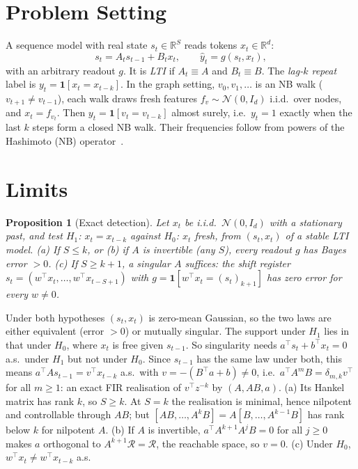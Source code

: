 \documentclass[journal]{IEEEtran}
\newtheorem{proposition}{Proposition}
\theoremstyle{remark}
\newcommand{\R}{\mathbb{R}}
\newcommand{\one}{\mathbf{1}}
\begin{document}
\section{Problem Setting}
A sequence model with real state $s_t\in\R^S$ reads tokens $x_t\in\R^d$:
\begin{equation}
  s_t = A_t s_{t-1} + B_t x_t,\qquad \hat y_t = g(s_t,x_t),
  \label{eq:ssm}
\end{equation}
with an arbitrary readout $g$. It is \emph{LTI} if $A_t\equiv A$ and
$B_t\equiv B$. The \emph{lag-$k$ repeat} label is $y_t=\one[x_t=x_{t-k}]$.
In the graph setting, $v_0,v_1,\dots$ is an NB walk ($v_{t+1}\ne v_{t-1}$),
each walk draws fresh features $f_v\sim\mathcal N(0,I_d)$ i.i.d.\ over nodes,
and $x_t=f_{v_t}$. Then $y_t=\one[v_t=v_{t-k}]$ almost surely, i.e.\ $y_t=1$
exactly when the last $k$ steps form a closed NB walk. Their frequencies
follow from powers of the Hashimoto (NB) operator~\cite{hashimoto1989zeta,alon2007nbw}.

\section{Limits}
\begin{proposition}[Exact detection]\label{prop:exact}
Let $x_t$ be i.i.d.\ $\mathcal N(0,I_d)$ with a stationary past, and test
$H_1$: $x_t=x_{t-k}$ against $H_0$: $x_t$ fresh, from $(s_t,x_t)$ of a
stable LTI model. (a) If $S\le k$, or (b) if $A$ is invertible (any $S$), every readout
$g$ has Bayes error $>0$. (c) If $S\ge k+1$, a singular $A$ suffices: the
shift register $s_t=(w^\top x_t,\dots,w^\top x_{t-S+1})$ with
$g=\one[w^\top x_t=(s_t)_{k+1}]$ has zero error for every $w\ne0$.
\end{proposition}
\begin{IEEEproof}
Under both hypotheses $(s_t,x_t)$ is zero-mean Gaussian, so the two laws are
either equivalent (error $>0$) or mutually singular. The support under
$H_1$ lies in that under $H_0$, where $x_t$ is free given $s_{t-1}$. So
singularity needs $a^\top s_t+b^\top x_t=0$ a.s.\ under $H_1$ but not under
$H_0$. Since
$s_{t-1}$ has the same law under both, this means
$a^\top As_{t-1}=v^\top x_{t-k}$ a.s.\ with $v=-(B^\top a+b)\ne0$, i.e.\
$a^\top A^mB=\delta_{m,k}v^\top$ for all $m\ge1$: an exact FIR realisation of
$v^\top z^{-k}$ by $(A,AB,a)$. (a) Its Hankel matrix has rank $k$, so $S\ge k$.
At $S=k$ the realisation is minimal, hence nilpotent and controllable through
$AB$; but $[AB,\dots,A^kB]=A[B,\dots,A^{k-1}B]$ has rank below $k$ for
nilpotent $A$. (b) If $A$ is invertible, $a^\top A^{k+1}A^jB=0$ for all
$j\ge0$ makes $a$ orthogonal to $A^{k+1}\mathcal R=\mathcal R$, the reachable
space, so $v=0$. (c) Under $H_0$, $w^\top x_t\ne w^\top x_{t-k}$ a.s.
\end{IEEEproof}
\end{document}
